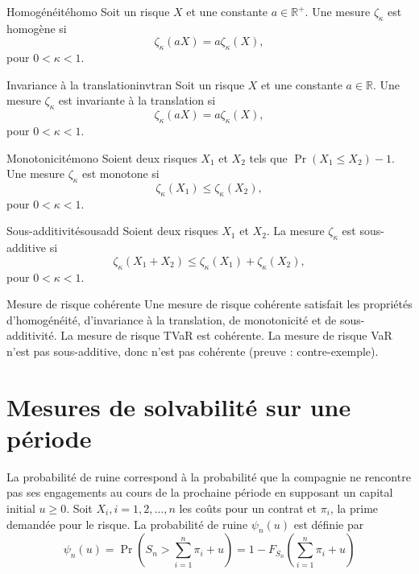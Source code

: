 \begin{propriete}{Homogénéité}{homo}
	Soit un risque $X$ et une constante $a \in \mathbb{R}^+$. Une mesure $\zeta_\kappa$ est homogène si $$\zeta_\kappa(aX) = a\zeta_\kappa(X),$$
	pour $0<\kappa<1$.
\end{propriete}

\begin{propriete}{Invariance à la translation}{invtran}
	Soit un risque $X$ et une constante $a \in \mathbb{R}$. Une mesure $\zeta_\kappa$ est invariante à la translation si $$\zeta_\kappa(aX) = a\zeta_\kappa(X),$$
	pour $0<\kappa<1$.
\end{propriete}

\begin{propriete}{Monotonicité}{mono}
	Soient deux risques $X_1$ et $X_2$ tels que $\Pr(X_1 \leq X_2) - 1$. Une mesure $\zeta_\kappa$ est monotone si 
	$$\zeta_\kappa(X_1) \leq \zeta_\kappa(X_2),$$
	pour $0<\kappa<1$.
\end{propriete}

\begin{propriete}{Sous-additivité}{sousadd}
	Soient deux risques $X_1$ et $X_2$. La mesure $\zeta_\kappa$ est sous-additive si 
	$$\zeta_\kappa(X_1 + X_2)\leq \zeta_\kappa(X_1) + \zeta_\kappa(X_2),$$
	pour $0<\kappa<1$.
\end{propriete}

\begin{definition}{Mesure de risque cohérente}{}
	Une mesure de risque cohérente satisfait les propriétés d'homogénéité, d'invariance à la translation, de monotonicité et de sous-additivité. La mesure de risque TVaR est cohérente. La mesure de risque VaR n'est pas sous-additive, donc n'est pas cohérente (preuve : contre-exemple).
\end{definition}

\section{Mesures de solvabilité sur une période}

\begin{definition}{}{}
	La probabilité de ruine correspond à la probabilité que la compagnie ne rencontre pas ses engagements au cours de la prochaine période en supposant un capital initial $u\geq 0$. Soit $X_i, i = 1, 2, \dots, n$ les coûts pour un contrat et $\pi_i$, la prime demandée pour le risque. La probabilité de ruine $\psi_n(u)$ est définie par
	$$\psi_n(u) = \Pr\left(S_n > \sum_{i = 1}^{n} \pi_i + u\right) = 1 - F_{S_n}\left(\sum_{i = 1}^{n}\pi_i + u\right)$$
\end{definition}
